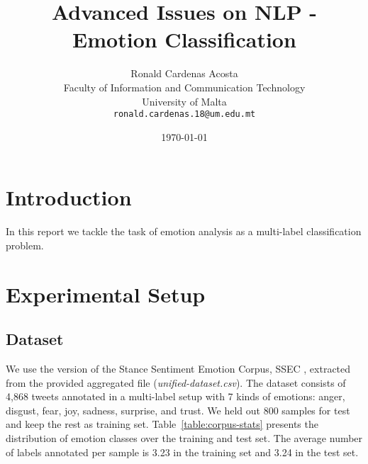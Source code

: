 \documentclass[11pt,a4paper]{article}
\title{Advanced Issues on NLP - Emotion Classification}
\author{Ronald Cardenas Acosta\\
  Faculty of Information and Communication Technology \\
  University of Malta \\
  {\tt ronald.cardenas.18@um.edu.mt} \\}
\date{\today}
\begin{document}
\maketitle

\section{Introduction}

In this report we tackle the task of emotion analysis as a multi-label classification problem.

%
%


\section{Experimental Setup}

\subsection{Dataset}

We use the version of the Stance Sentiment Emotion Corpus, SSEC \cite{schuff2017annotation},  extracted from the provided aggregated file ({\it unified-dataset.csv}).
The dataset consists of 4,868 tweets annotated in a multi-label setup with 7 kinds of emotions: anger, disgust, fear, joy,  sadness, surprise, and trust.
We held out 800 samples for test and keep the rest as training set.
Table~\ref{table:corpus-stats}  presents the distribution of emotion classes over the training and test set. The average number of labels annotated per sample is 3.23 in the training set and 3.24 in the test set.
\end{document}
